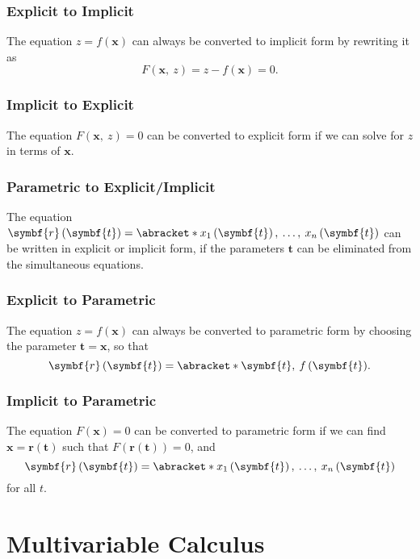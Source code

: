 \documentclass{article}
\begin{document}
\subsubsection{Explicit to Implicit}
The equation \(z = f\left( \symbf{x} \right)\) can always be converted
to implicit form by rewriting it as
\begin{equation*}
    F\left( \symbf{x},\: z \right) = z - f\left( \symbf{x} \right) = 0.
\end{equation*}
\subsubsection{Implicit to Explicit}
The equation \(F\left( \symbf{x},\: z \right) = 0\) can be converted to
explicit form if we can solve for \(z\) in terms of \(\symbf{x}\).
\subsubsection{Parametric to Explicit/Implicit}
The equation \(\symbf{r}\left( \symbf{t} \right) = \abracket*{x_1\left(
\symbf{t} \right),\: \dots,\: x_n\left( \symbf{t} \right)}\) can be
written in explicit or implicit form, if the parameters \(\symbf{t}\)
can be eliminated from the simultaneous equations.
\subsubsection{Explicit to Parametric}
The equation \(z = f\left( \symbf{x} \right)\) can always be converted
to parametric form by choosing the parameter \(\symbf{t} = \symbf{x}\),
so that
\begin{equation*}
    \symbf{r}\left( \symbf{t} \right) = \abracket*{\symbf{t},\: f\left( \symbf{t} \right)}.
\end{equation*}
\subsubsection{Implicit to Parametric}
The equation \(F\left( \symbf{x} \right) = 0\) can be converted to
parametric form if we can find \(\symbf{x} = \symbf{r}\left( \symbf{t}
\right)\) such that \(F\left( \symbf{r}\left( \symbf{t} \right) \right)
= 0\), and
\begin{equation*}
    \symbf{r}\left( \symbf{t} \right) = \abracket*{x_1\left( \symbf{t} \right),\: \dots,\: x_n\left( \symbf{t} \right)}
\end{equation*}
for all \(t\).
\section{Multivariable Calculus}
\end{document}
